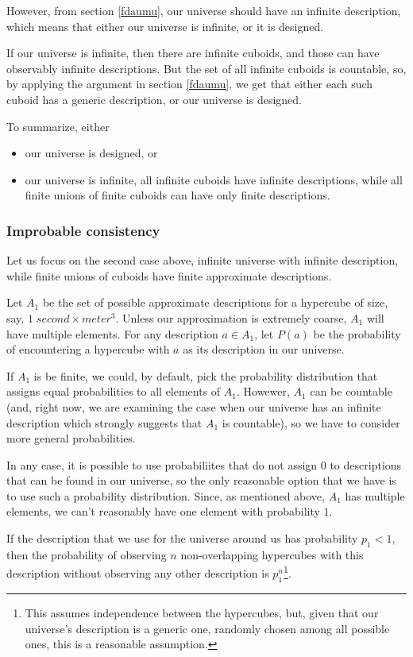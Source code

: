 \documentclass[a4paper
,draft
]{article}
\begin{document}
However, from section \ref{fdaumu}, our universe should have an
infinite description, which means that either our universe is infinite,
or it is designed.

If our universe is infinite,
then there are infinite cuboids, and those can have
observably infinite descriptions.
But the set of all infinite cuboids is countable, so, by applying the argument
in section \ref{fdaumu}, we get that either each such cuboid has a generic
description, or our universe is designed.

To summarize, either
\begin{itemize}
  \item our universe is designed, or
  \item our universe is infinite, all infinite cuboids have infinite
        descriptions, while all finite unions of finite cuboids
        can have only finite descriptions.
\end{itemize}

\subsubsection{Improbable consistency}

Let us focus on the second case above, infinite universe with infinite
description, while finite unions of cuboids have finite approximate
descriptions.

Let $A_1$ be the set of possible approximate descriptions for
a hypercube of size, say, $1\;second \times meter^3$.
Unless our approximation is extremely coarse, $A_1$ will have multiple elements.
For any description $a\in A_1$, let $P(a)$ be the probability of encountering
a hypercube with $a$ as its description in our universe.

If $A_1$ is be finite, we could, by default, pick the probability
distribution that assigns equal probabilities to all elements of $A_1$.
Howewer, $A_1$ can be countable (and, right now, we are examining the case when
our universe has an infinite description which strongly suggests that $A_1$
is countable), so we have to consider more general probabilities.

In any case, it is possible to use probabiliites that do not assign $0$
to descriptions that can be found in our universe, so the only reasonable
option that we have is to use such a probability distribution.
Since, as mentioned above, $A_1$ has multiple elements, we can't reasonably
have one element with probability $1$.

If the description that we use for the universe around us
has probability $p_1 < 1$, then the probability of observing $n$
non-overlapping hypercubes
with this description without observing any other description is
$p_1^n$\footnote{
  This assumes independence between the hypercubes, but, given that our
  universe's description is a generic one, randomly chosen among all possible
  ones, this is a reasonable assumption.
}.
\end{document}
